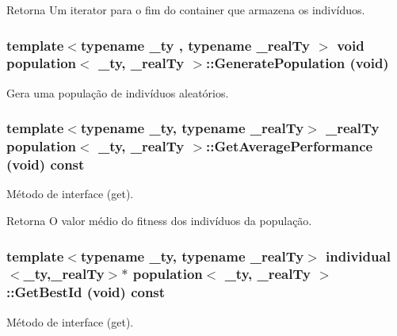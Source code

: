 \begin{DoxyReturn}{Retorna}
Um iterator para o fim do container que armazena os indivíduos. 
\end{DoxyReturn}
\hypertarget{classpopulation_a20b40816fade14ec740cdc3f22d8066e}{
\subsubsection[{GeneratePopulation}]{\setlength{\rightskip}{0pt plus 5cm}template$<$typename \_\-ty , typename \_\-realTy $>$ void {\bf population}$<$ \_\-ty, \_\-realTy $>$::GeneratePopulation (void)}}
\label{classpopulation_a20b40816fade14ec740cdc3f22d8066e}
Gera uma população de indivíduos aleatórios. \hypertarget{classpopulation_a3c0a549de81a152a15f052e57f106a86}{
\subsubsection[{GetAveragePerformance}]{\setlength{\rightskip}{0pt plus 5cm}template$<$typename \_\-ty, typename \_\-realTy$>$ \_\-realTy {\bf population}$<$ \_\-ty, \_\-realTy $>$::GetAveragePerformance (void) const}}
\label{classpopulation_a3c0a549de81a152a15f052e57f106a86}
Método de interface (get).

\begin{DoxyReturn}{Retorna}
O valor médio do fitness dos indivíduos da população. 
\end{DoxyReturn}
\hypertarget{classpopulation_a9b2b5de6f220010a0d6c780b7ce04e5b}{
\subsubsection[{GetBestId}]{\setlength{\rightskip}{0pt plus 5cm}template$<$typename \_\-ty, typename \_\-realTy$>$ {\bf individual}$<$\_\-ty,\_\-realTy$>$$\ast$ {\bf population}$<$ \_\-ty, \_\-realTy $>$::GetBestId (void) const}}
\label{classpopulation_a9b2b5de6f220010a0d6c780b7ce04e5b}
Método de interface (get).

